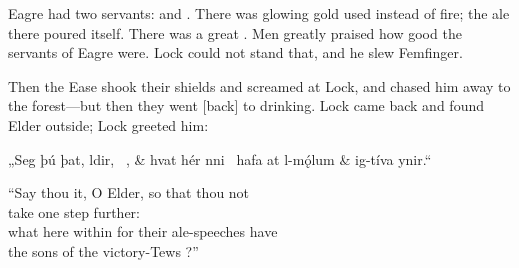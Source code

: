 Eagre had two servants:  and . There was glowing gold used instead of fire; the ale there poured itself. There was a great . Men greatly praised how good the servants of Eagre were. Lock could not stand that, and he slew Femfinger.

Then the Ease shook their shields and screamed at Lock, and chased him away to the forest—but then they went [back] to drinking. Lock came back and found Elder outside; Lock greeted him:\epb\epg

\sectionline

\bvg
\bva „Seg þú þat, ldir, \hld\ , &
hvat hér nni \hld\ hafa at l-mǫ́lum &
\ind {}ig-tíva ynir.“\eva

\bvb “Say thou it, O Elder, so that thou not \\
take one step further: \\
what here within for their ale-speeches have \\
the sons of the victory-Tews ?”\evb
\evg


